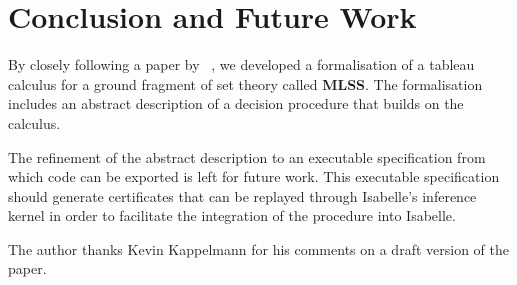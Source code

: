 \documentclass[
  sigplan,
  10pt,
  ]{acmart}
\newcommand{\MLSS}{\textbf{MLSS}}
\begin{document}
\section{Conclusion and Future Work}
By closely following a paper by \citeauthor{new_fast_tableau}~\cite{new_fast_tableau}, we developed a formalisation of a tableau calculus for a ground fragment of set theory called \MLSS{}.
The formalisation includes an abstract description of a decision procedure that builds on the calculus.

The refinement of the abstract description to an executable specification from which code can be exported is left for future work.
This executable specification should generate certificates that can be replayed through Isabelle's inference kernel in order to facilitate the integration of the procedure into Isabelle.


\begin{acks}
  The author thanks Kevin Kappelmann for his comments on a draft version of the paper.
\end{acks}



\end{document}
